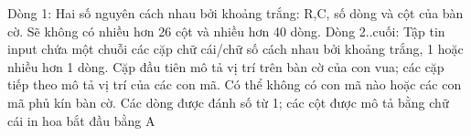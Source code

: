 Dòng 1: Hai số nguyên cách nhau bởi khoảng trắng: R,C, số dòng và cột của bàn cờ. Sẽ không có nhiều hơn 26 cột và nhiều hơn 40 dòng. Dòng 2..cuối: Tập tin input chứa một chuỗi các cặp chữ cái/chữ số cách nhau bởi khoảng trắng, 1 hoặc nhiều hơn 1 dòng. Cặp đầu tiên mô tả vị trí trên bàn cờ của con vua; các cặp tiếp theo mô tả vị trí của các con mã. Có thể không có con mã nào hoặc các con mã phủ kín bàn cờ. Các dòng được đánh số từ 1; các cột được mô tả bằng chữ cái in hoa bắt đầu bằng A